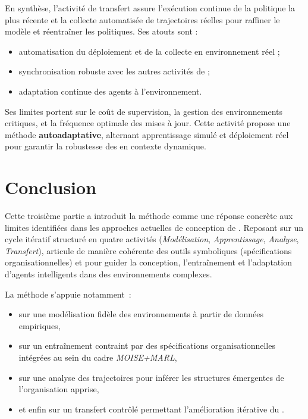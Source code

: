 En synthèse, l'activité de transfert assure l'exécution continue de la politique la plus récente et la collecte automatisée de trajectoires réelles pour raffiner le modèle et réentraîner les politiques.
%
Ses atouts sont :
\begin{itemize}
  \item automatisation du déploiement et de la collecte en environnement réel ;
  \item synchronisation robuste avec les autres activités de  ;
  \item adaptation continue des agents à l'environnement.
\end{itemize}

Ses limites portent sur le coût de supervision, la gestion des environnements critiques, et la fréquence optimale des mises à jour.
%
Cette activité propose une méthode \textbf{autoadaptative}, alternant apprentissage simulé et déploiement réel pour garantir la robustesse des  en contexte dynamique.



\clearpage
\thispagestyle{empty}
\null
\newpage

\chapter*{Conclusion}

\noindent
Cette troisième partie a introduit la méthode \textbf{} comme une réponse concrète aux limites identifiées dans les approches actuelles de conception de . Reposant sur un cycle itératif structuré en quatre activités (\textit{Modélisation}, \textit{Apprentissage}, \textit{Analyse}, \textit{Transfert}),  articule de manière cohérente des outils symboliques (spécifications organisationnelles) et  pour guider la conception, l'entraînement et l'adaptation d'agents intelligents dans des environnements complexes.

\medskip

\noindent
La méthode s'appuie notamment~:
\begin{itemize}
  \item sur une modélisation fidèle des environnements à partir de données empiriques,
  \item sur un entraînement contraint par des spécifications organisationnelles intégrées au sein du cadre \textit{MOISE+MARL},
  \item sur une analyse des trajectoires pour inférer les structures émergentes de l'organisation apprise,
  \item et enfin sur un transfert contrôlé permettant l'amélioration itérative du .
\end{itemize}

